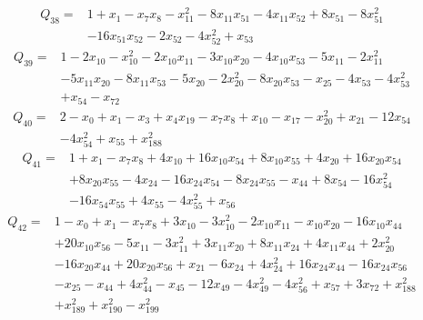 \begin{equation*}\begin{aligned}
Q_{38}={}& 1+x_{1}-x_{7}x_{8}-x_{11}^{2}-8x_{11}x_{51}-4x_{11}x_{52}+8x_{51}-8x_{51}^{2}\\
& -16x_{51}x_{52}-2x_{52}-4x_{52}^{2}+x_{53}
\end{aligned}\end{equation*}
\begin{equation*}\begin{aligned}
Q_{39}={}& 1-2x_{10}-x_{10}^{2}-2x_{10}x_{11}-3x_{10}x_{20}-4x_{10}x_{53}-5x_{11}-2x_{11}^{2}\\
& -5x_{11}x_{20}-8x_{11}x_{53}-5x_{20}-2x_{20}^{2}-8x_{20}x_{53}-x_{25}-4x_{53}-4x_{53}^{2}\\
& +x_{54}-x_{72}
\end{aligned}\end{equation*}
\begin{equation*}\begin{aligned}
Q_{40}={}& 2-x_{0}+x_{1}-x_{3}+x_{4}x_{19}-x_{7}x_{8}+x_{10}-x_{17}-x_{20}^{2}+x_{21}-12x_{54}\\
& -4x_{54}^{2}+x_{55}+x_{188}^{2}
\end{aligned}\end{equation*}
\begin{equation*}\begin{aligned}
Q_{41}={}& 1+x_{1}-x_{7}x_{8}+4x_{10}+16x_{10}x_{54}+8x_{10}x_{55}+4x_{20}+16x_{20}x_{54}\\
& +8x_{20}x_{55}-4x_{24}-16x_{24}x_{54}-8x_{24}x_{55}-x_{44}+8x_{54}-16x_{54}^{2}\\
& -16x_{54}x_{55}+4x_{55}-4x_{55}^{2}+x_{56}
\end{aligned}\end{equation*}
\begin{equation*}\begin{aligned}
Q_{42}={}& 1-x_{0}+x_{1}-x_{7}x_{8}+3x_{10}-3x_{10}^{2}-2x_{10}x_{11}-x_{10}x_{20}-16x_{10}x_{44}\\
& +20x_{10}x_{56}-5x_{11}-3x_{11}^{2}+3x_{11}x_{20}+8x_{11}x_{24}+4x_{11}x_{44}+2x_{20}^{2}\\
& -16x_{20}x_{44}+20x_{20}x_{56}+x_{21}-6x_{24}+4x_{24}^{2}+16x_{24}x_{44}-16x_{24}x_{56}\\
& -x_{25}-x_{44}+4x_{44}^{2}-x_{45}-12x_{49}-4x_{49}^{2}-4x_{56}^{2}+x_{57}+3x_{72}+x_{188}^{2}\\
& +x_{189}^{2}+x_{190}^{2}-x_{199}^{2}
\end{aligned}\end{equation*}
